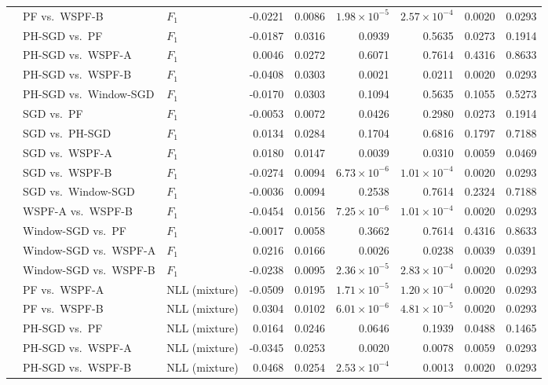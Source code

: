 {\begin{longtable}{@{}lllrrrrrr@{}}
 & PF vs.\ WSPF-B & $F_1$ & -0.0221 & 0.0086 & $1.98\times 10^{-5}$ & $2.57\times 10^{-4}$ & 0.0020 & 0.0293 \\
 & PH-SGD vs.\ PF & $F_1$ & -0.0187 & 0.0316 & 0.0939 & 0.5635 & 0.0273 & 0.1914 \\
 & PH-SGD vs.\ WSPF-A & $F_1$ & 0.0046 & 0.0272 & 0.6071 & 0.7614 & 0.4316 & 0.8633 \\
 & PH-SGD vs.\ WSPF-B & $F_1$ & -0.0408 & 0.0303 & 0.0021 & 0.0211 & 0.0020 & 0.0293 \\
 & PH-SGD vs.\ Window-SGD & $F_1$ & -0.0170 & 0.0303 & 0.1094 & 0.5635 & 0.1055 & 0.5273 \\
 & SGD vs.\ PF & $F_1$ & -0.0053 & 0.0072 & 0.0426 & 0.2980 & 0.0273 & 0.1914 \\
 & SGD vs.\ PH-SGD & $F_1$ & 0.0134 & 0.0284 & 0.1704 & 0.6816 & 0.1797 & 0.7188 \\
 & SGD vs.\ WSPF-A & $F_1$ & 0.0180 & 0.0147 & 0.0039 & 0.0310 & 0.0059 & 0.0469 \\
 & SGD vs.\ WSPF-B & $F_1$ & -0.0274 & 0.0094 & $6.73\times 10^{-6}$ & $1.01\times 10^{-4}$ & 0.0020 & 0.0293 \\
 & SGD vs.\ Window-SGD & $F_1$ & -0.0036 & 0.0094 & 0.2538 & 0.7614 & 0.2324 & 0.7188 \\
 & WSPF-A vs.\ WSPF-B & $F_1$ & -0.0454 & 0.0156 & $7.25\times 10^{-6}$ & $1.01\times 10^{-4}$ & 0.0020 & 0.0293 \\
 & Window-SGD vs.\ PF & $F_1$ & -0.0017 & 0.0058 & 0.3662 & 0.7614 & 0.4316 & 0.8633 \\
 & Window-SGD vs.\ WSPF-A & $F_1$ & 0.0216 & 0.0166 & 0.0026 & 0.0238 & 0.0039 & 0.0391 \\
 & Window-SGD vs.\ WSPF-B & $F_1$ & -0.0238 & 0.0095 & $2.36\times 10^{-5}$ & $2.83\times 10^{-4}$ & 0.0020 & 0.0293 \\
 & PF vs.\ WSPF-A & NLL (mixture) & -0.0509 & 0.0195 & $1.71\times 10^{-5}$ & $1.20\times 10^{-4}$ & 0.0020 & 0.0293 \\
 & PF vs.\ WSPF-B & NLL (mixture) & 0.0304 & 0.0102 & $6.01\times 10^{-6}$ & $4.81\times 10^{-5}$ & 0.0020 & 0.0293 \\
 & PH-SGD vs.\ PF & NLL (mixture) & 0.0164 & 0.0246 & 0.0646 & 0.1939 & 0.0488 & 0.1465 \\
 & PH-SGD vs.\ WSPF-A & NLL (mixture) & -0.0345 & 0.0253 & 0.0020 & 0.0078 & 0.0059 & 0.0293 \\
 & PH-SGD vs.\ WSPF-B & NLL (mixture) & 0.0468 & 0.0254 & $2.53\times 10^{-4}$ & 0.0013 & 0.0020 & 0.0293 \\

\end{longtable}}
